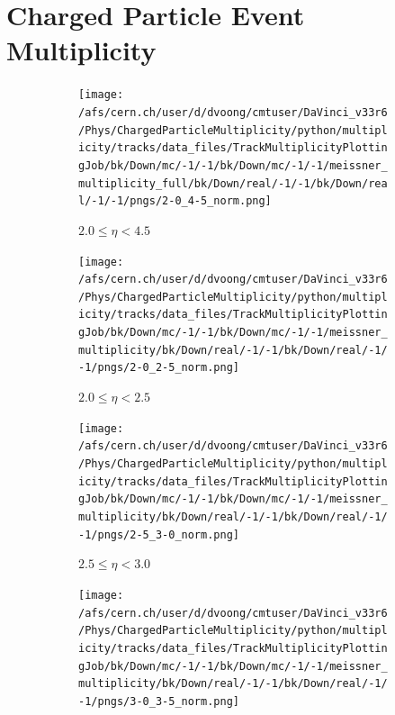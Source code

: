 \section{Charged Particle Event Multiplicity}
\label{section: charged particle event multiplicity}

\begin{figure}[h]
	\begin{subfigure}[h]{0.32\textwidth}
		\texttt{[image: /afs/cern.ch/user/d/dvoong/cmtuser/DaVinci\_v33r6/Phys/ChargedParticleMultiplicity/python/multiplicity/tracks/data\_files/TrackMultiplicityPlottingJob/bk/Down/mc/-1/-1/bk/Down/mc/-1/-1/meissner\_multiplicity\_full/bk/Down/real/-1/-1/bk/Down/real/-1/-1/pngs/2-0\_4-5\_norm.png]}
		\caption{$2.0 \le \eta < 4.5$}
		\label{fig: reconstructed track multiplicity measured down 2.0 - 4.5}
	\end{subfigure}
	\begin{subfigure}[h]{0.32\textwidth}
		\texttt{[image: /afs/cern.ch/user/d/dvoong/cmtuser/DaVinci\_v33r6/Phys/ChargedParticleMultiplicity/python/multiplicity/tracks/data\_files/TrackMultiplicityPlottingJob/bk/Down/mc/-1/-1/bk/Down/mc/-1/-1/meissner\_multiplicity/bk/Down/real/-1/-1/bk/Down/real/-1/-1/pngs/2-0\_2-5\_norm.png]}
		\caption{$2.0 \le \eta < 2.5$}
		\label{fig: reconstructed track multiplicity measured down 2.0 - 2.5}
	\end{subfigure}
	\begin{subfigure}[h]{0.32\textwidth}
		\texttt{[image: /afs/cern.ch/user/d/dvoong/cmtuser/DaVinci\_v33r6/Phys/ChargedParticleMultiplicity/python/multiplicity/tracks/data\_files/TrackMultiplicityPlottingJob/bk/Down/mc/-1/-1/bk/Down/mc/-1/-1/meissner\_multiplicity/bk/Down/real/-1/-1/bk/Down/real/-1/-1/pngs/2-5\_3-0\_norm.png]}
		\caption{$2.5 \le \eta < 3.0$}
		\label{fig: reconstructed track multiplicity measured down 2.5 - 3.0}
	\end{subfigure}
	\begin{subfigure}[h]{0.32\textwidth}
		\texttt{[image: /afs/cern.ch/user/d/dvoong/cmtuser/DaVinci\_v33r6/Phys/ChargedParticleMultiplicity/python/multiplicity/tracks/data\_files/TrackMultiplicityPlottingJob/bk/Down/mc/-1/-1/bk/Down/mc/-1/-1/meissner\_multiplicity/bk/Down/real/-1/-1/bk/Down/real/-1/-1/pngs/3-0\_3-5\_norm.png]}

\end{subfigure}
\end{figure}
